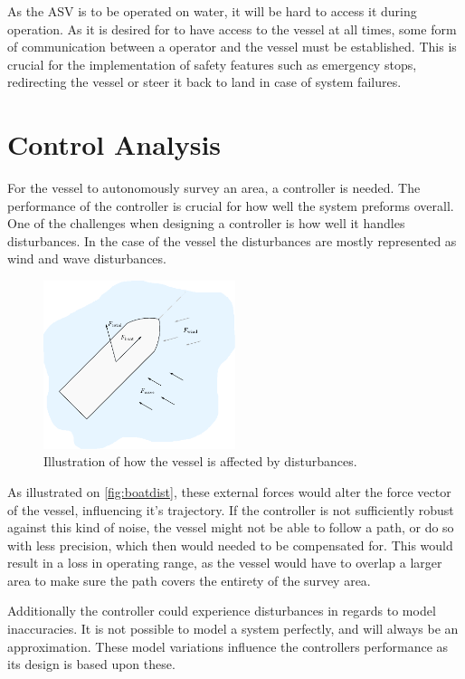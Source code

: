As the ASV is to be operated on water, it will be hard to access it during operation. 
As it is desired for to have access to the vessel at all times, some form of communication between a operator and the vessel must be established. 
This is crucial for the implementation of safety features such as emergency stops, redirecting the vessel or steer it back to land in case of system failures.

\section{Control Analysis}
For the vessel to autonomously survey an area, a controller is needed. 
The performance of the controller is crucial for how well the system preforms overall. 
One of the challenges when designing a controller is how well it handles disturbances. 
In the case of the vessel the disturbances are mostly represented as wind and wave disturbances. 
\begin{figure}[H]
    \includegraphics[width=0.5\textwidth]{figures/boatdisturbance}
    \caption{Illustration of how the vessel is affected by disturbances.}
    \label{fig:boatdist}
\end{figure}

As illustrated on \autoref{fig:boatdist}, these external forces would alter the force vector of the vessel, influencing it's trajectory. 
If the controller is not sufficiently robust against this kind of noise, the vessel might not be able to follow a path, or do so with less precision, which then would needed to be compensated for. 
This would result in a loss in operating range, as the vessel would have to overlap a larger area to make sure the path covers the entirety of the survey area.

Additionally the controller could experience disturbances in regards to model inaccuracies. 
It is not possible to model a system perfectly, and will always be an approximation. 
These model variations influence the controllers performance as its design is based upon these. 

